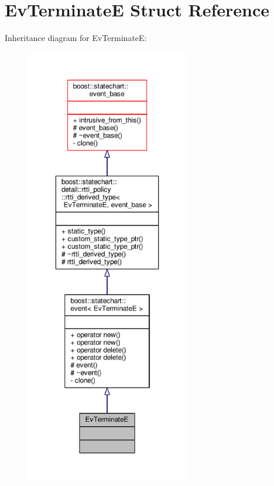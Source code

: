 \hypertarget{struct_ev_terminate_e}{}\section{Ev\+TerminateE Struct Reference}
\label{struct_ev_terminate_e}


Inheritance diagram for Ev\+TerminateE\+:
\nopagebreak
\begin{figure}[H]
\begin{center}
\leavevmode
\includegraphics[height=550pt]{struct_ev_terminate_e__inherit__graph}
\end{center}
\end{figure}


